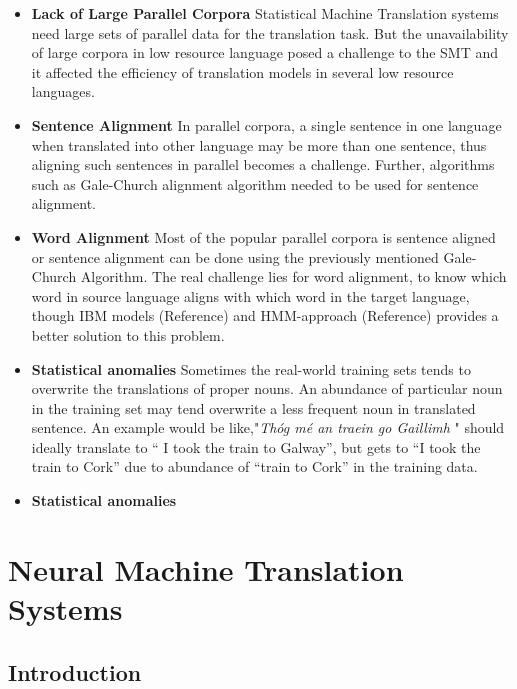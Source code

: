 \begin{itemize}
    \item \textbf{Lack of Large Parallel Corpora}   Statistical Machine Translation systems need large sets of parallel data for the translation task. But the unavailability of large corpora in low resource language posed a challenge to the SMT and it affected the efficiency of translation models in several low resource languages.
    \item\textbf{Sentence Alignment }   In parallel corpora, a single sentence in one language when translated into other language may be more than one sentence, thus aligning such sentences in parallel becomes a challenge. Further, algorithms such as Gale-Church alignment algorithm needed to be used for sentence alignment.
     \item\textbf{Word Alignment }      Most of the popular parallel corpora is sentence aligned or sentence alignment can be done using the previously mentioned Gale-Church Algorithm. The real challenge lies for word alignment, to know which word in source language aligns with which word in the target language, though IBM models (Reference) and HMM-approach (Reference) provides a better solution to this problem.
      \item\textbf{Statistical anomalies }  Sometimes the real-world training sets tends to overwrite the translations of proper nouns. An abundance of particular noun in the training set may tend overwrite a less frequent noun in translated sentence. An example would be like,"\textit{Thóg mé an traein go Gaillimh} " should ideally translate to “ I took the train to Galway”, but gets to “I took the train to Cork” due to abundance of “train to Cork” in the training data.
       \item\textbf{Statistical anomalies }
\end{itemize}
\section{Neural Machine Translation Systems}
\subsection{Introduction}
